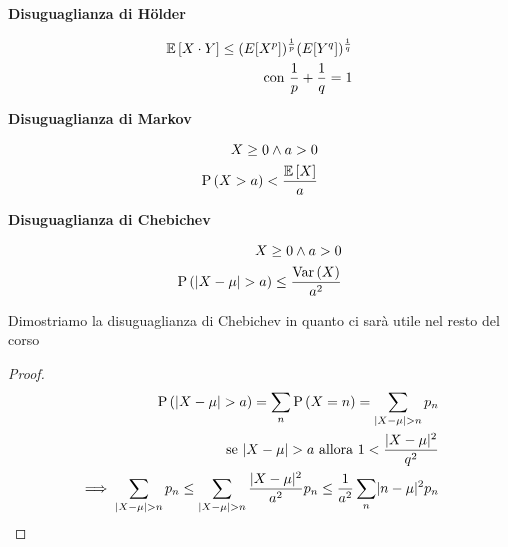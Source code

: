 \begin{defn}
    \textbf{Disuguaglianza di Hölder}
    
    \begin{equation}
        \begin{aligned}
        \mathbb{E}\left[X \cdot Y\right] \leq (E[X^p])^{\frac{1}{p}} (E[Y^q])^{\frac{1}{q}} \\
        \text{con } \dfrac{1}{p} + \dfrac{1}{q} = 1
        \end{aligned}
    \end{equation}
\end{defn}


\begin{defn}
    \textbf{Disuguaglianza di Markov}
    
    \begin{equation}
        \begin{aligned}
        X \geq 0 \land a > 0 \\
        \text{P}\left(X > a\right) < \dfrac{\mathbb{E}\left[X\right]}{a}
        \end{aligned}
    \end{equation}
\end{defn}

\begin{defn}
    \textbf{Disuguaglianza di Chebichev}
    
    \begin{equation*}
        \begin{aligned}
            X \geq 0 \land a > 0 \\
            \text{P}\left(\lvert X - \mu\rvert > a\right) \leq \dfrac{\text{Var}\left(X\right)}{a^2}
        \end{aligned}
    \end{equation*}
    
    Dimostriamo la disuguaglianza di Chebichev in quanto ci sarà utile nel resto del corso
    
    \begin{proof}
        \begin{equation*}
            \begin{aligned}
                \text{P}\left(\lvert X - \mu\rvert > a\right) = \sum_n \text{P}\left(X = n\right) = \sum_{\lvert X - \mu\rvert > n} p_n \\
                \text{se } \lvert X - \mu\rvert > a \text{ allora } 1 < \dfrac{\lvert X - \mu\rvert^2}{q^2} \\ \implies  \sum_{\lvert X - \mu\rvert > n} p_n  \leq \sum_{\lvert X - \mu\rvert > n} \dfrac{\lvert X - \mu\rvert^2}{a^2} p_n \leq \dfrac{1}{a^2} \sum_n \lvert n - \mu\rvert^2 p_n 
            \end{aligned}
        \end{equation*}
    \end{proof}
\end{defn}


